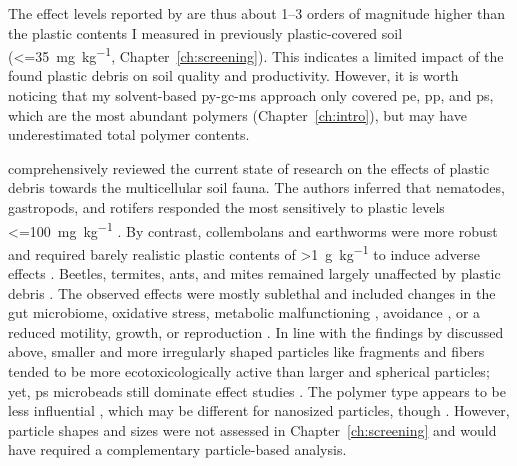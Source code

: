 The effect levels reported by \citet{deSouzaMachadoMicroplastics2019,GaoEffects2019} are thus about \numrange{1}{3} orders of magnitude higher than the plastic contents I measured in previously plastic-covered soil (\SI{<=35}{\milli\gram\per\kilo\gram}, Chapter~\ref{ch:screening}). This indicates a limited impact of the found plastic debris on soil quality and productivity. However, it is worth noticing that my solvent-based \ac{py-gc-ms} approach only covered \ac{pe}, \ac{pp}, and \ac{ps}, which are the most abundant polymers (Chapter~\ref{ch:intro}), but may have underestimated total polymer contents.

 comprehensively reviewed the current state of research on the effects of plastic debris towards the multicellular soil fauna. The authors inferred that nematodes, gastropods, and rotifers responded the most sensitively to plastic levels \SI{<=100}{\milli\gram\per\kilo\gram} \citep[for instance,][]{KimSizedependent2020,SongUptake2019}. By contrast, collembolans and earthworms were more robust and required barely realistic plastic contents of \SI{>1}{\gram\per\kilo\gram} to induce adverse effects \citep{JuEffects2019,DingEffect2021,LahiveMicroplastic2019}. Beetles, termites, ants, and mites remained largely unaffected by plastic debris \citep[for instance,][]{PengBiodegradation2019,ZhuTrophic2018}. The observed effects were mostly sublethal and included changes in the gut microbiome, oxidative stress, metabolic malfunctioning \citep{JuEffects2019,ChenDefense2020,Rodriguez-SeijoOxidative2018}, avoidance \citep{DingEffect2021}, or a reduced motility, growth, or reproduction \citep{BootsEffects2019,LahiveMicroplastic2019}. In line with the findings by \citet{deSouzaMachadoMicroplastics2019} discussed above, smaller and more irregularly shaped particles like fragments and fibers tended to be more ecotoxicologically active than larger and spherical particles; yet, \ac{ps} microbeads still dominate effect studies \citep{BuksWhat2020}. The polymer type appears to be less influential \citep{RilligMicroplastic2020}, which may be different for nanosized particles, though \citep{RilligMicroplastic2019}. However, particle shapes and sizes were not assessed in Chapter~\ref{ch:screening} and would have required a complementary particle-based analysis.

